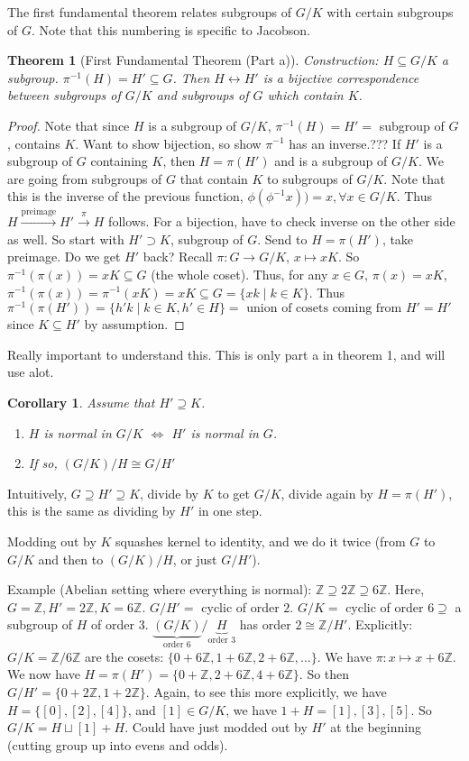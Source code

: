 \documentclass{article}
\theoremstyle{plain}
\newtheorem{theorem}{Theorem}
\newtheorem{corollary}{Corollary}
\theoremstyle{remark}
\newcommand{\Z}{{\mathbb Z}}
\begin{document}
The first fundamental theorem relates subgroups of $G/K$ with certain subgroups of $G$.
Note that this numbering is specific to Jacobson.
\begin{theorem}[First Fundamental Theorem (Part a)]
	Construction: $H \subseteq G/K$ a subgroup. $\pi^{-1}(H) = H' \subseteq G$.
	Then $H \leftrightarrow H'$ is a bijective correspondence between subgroups of
	$G/K$ and subgroups of $G$ which contain $K$.
\end{theorem}
\begin{proof}
	Note that since $H$ is a subgroup of $G/K$,
	$\pi^{-1}(H) = H' = $ subgroup of $G$, contains $K$.
	Want to show bijection, so show $\pi^{-1}$ has an inverse.???
	If $H'$ is a subgroup of $G$ containing $K$,
	then $H = \pi(H')$ and is a subgroup of $G/K$.
	We are going from subgroups of $G$ that contain $K$ to subgroups of $G/K$.
	Note that this is the inverse of the previous function, $\phi(\phi^{-1} x))
	= x, \forall x \in G/K$.
	Thus $H \xrightarrow{\text{preimage}} H' \xrightarrow{\pi} H$ follows.
	For a bijection, have to check inverse on the other side as well.
	So start with $H' \supset K$, subgroup of $G$.
	Send to $H = \pi(H')$, take preimage.
	Do we get $H'$ back?
	Recall $\pi \colon G \to G/K$, $x \mapsto xK$.
	So $\pi^{-1}(\pi(x)) = xK \subseteq G$ (the whole coset).
	Thus, for any $x \in G$, $\pi(x) = xK$, $\pi^{-1}(\pi(x)) = \pi^{-1}(xK)
	= xK \subseteq G = \{xk \mid k \in K\}$.
	Thus $\pi^{-1}(\pi(H')) = \{h'k \mid k \in K, h' \in H\} = \text{ union of cosets coming from } H' = H'$
	since $K \subseteq H'$ by assumption.
\end{proof}
Really important to understand this. This is only part a in theorem 1, and will use alot.

\begin{corollary}
	Assume that $H' \supseteq K$.
	\begin{enumerate}
		\item $H$ is normal in $G/K$ $\iff$ $H'$ is normal in $G$.
		\item If so, $(G/K)/H \cong G/H'$
	\end{enumerate}
\end{corollary}
Intuitively, $G \supseteq H' \supseteq K$,
divide by $K$ to get $G/K$, divide again by $H = \pi(H')$,
this is the same as dividing by $H'$ in one step.

Modding out by $K$ squashes kernel to identity, and we do it twice
(from $G$ to $G/K$ and then to $(G/K)/H$, or just $G/H'$).

Example (Abelian setting where everything is normal):
$\Z \supseteq 2\Z \supseteq 6\Z$.
Here, $G = \Z, H' = 2\Z, K = 6\Z$.
$G/H' = $ cyclic of order $2$.
$G/K = $ cyclic of order $6\supseteq$ a subgroup of $H$ of order $3$.
$\underbrace{(G/K)}_{\text{order }6}/\underbrace{H}_{\text{order }3}$ has order $2 \cong \Z/H'$.
Explicitly: $G/K = \Z/6\Z$ are the cosets: $\{0+6\Z,1+6\Z,2+6\Z, \dots\}$.
We have $\pi \colon x \mapsto x + 6\Z$.
We now have $H = \pi(H') = \{0+\Z, 2+6\Z, 4+6\Z\}$.
So then $G/H' = \{0+2\Z, 1+2\Z\}$.
Again, to see this more explicitly,
we have $H = \{[0], [2], [4]\}$,
and $[1] \in G/K$, we have $1 + H = [1], [3], [5]$.
So $G/K = H \sqcup [1] + H$.
Could have just modded out by $H'$ at the beginning (cutting group up into evens and odds).
\end{document}
